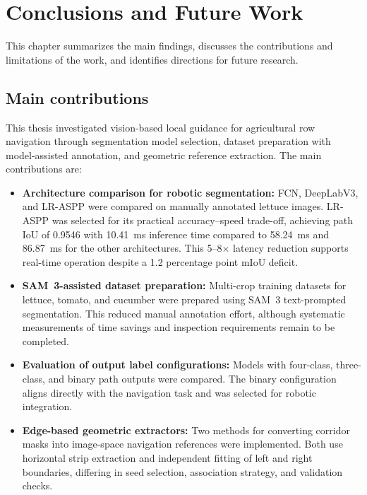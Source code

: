 \chapter{Conclusions and Future Work}
\label{cap:conclusions}

This chapter summarizes the main findings, discusses the contributions and limitations of the work, and identifies directions for future research.

\section{Main contributions}
\label{sec:contributions}

This thesis investigated vision-based local guidance for agricultural row navigation through segmentation model selection, dataset preparation with model-assisted annotation, and geometric reference extraction. The main contributions are:

\begin{itemize}
\item \textbf{Architecture comparison for robotic segmentation:} FCN, DeepLabV3, and LR-ASPP were compared on manually annotated lettuce images. LR-ASPP was selected for its practical accuracy--speed trade-off, achieving path IoU of 0.9546 with 10.41~ms inference time compared to 58.24~ms and 86.87~ms for the other architectures. This 5--8$\times$ latency reduction supports real-time operation despite a 1.2 percentage point mIoU deficit.

\item \textbf{SAM~3-assisted dataset preparation:} Multi-crop training datasets for lettuce, tomato, and cucumber were prepared using SAM~3 text-prompted segmentation. This reduced manual annotation effort, although systematic measurements of time savings and inspection requirements remain to be completed.

\item \textbf{Evaluation of output label configurations:} Models with four-class, three-class, and binary path outputs were compared. The binary configuration aligns directly with the navigation task and was selected for robotic integration.

\item \textbf{Edge-based geometric extractors:} Two methods for converting corridor masks into image-space navigation references were implemented. Both use horizontal strip extraction and independent fitting of left and right boundaries, differing in seed selection, association strategy, and validation checks.
\end{itemize}

